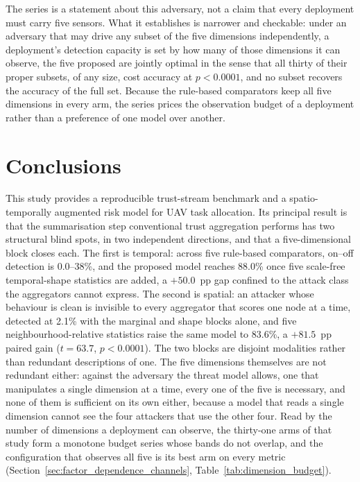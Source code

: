 \documentclass[notspecified,article,submit,moreauthors]{Definitions/mdpi}
\begin{document}
The series is a statement about this adversary, not a claim that every deployment must carry five sensors. What it establishes is narrower and checkable: under an adversary that may drive any subset of the five dimensions independently, a deployment's detection capacity is set by how many of those dimensions it can observe, the five proposed are jointly optimal in the sense that all thirty of their proper subsets, of any size, cost accuracy at $p<0.0001$, and no subset recovers the accuracy of the full set. Because the rule-based comparators keep all five dimensions in every arm, the series prices the observation budget of a deployment rather than a preference of one model over another.

\section{Conclusions}
\label{sec:conclusions}

This study provides a reproducible trust-stream benchmark and a spatio-temporally augmented risk model for UAV task allocation. Its principal result is that the summarisation step conventional trust aggregation performs has two structural blind spots, in two independent directions, and that a five-dimensional block closes each. The first is temporal: across five rule-based comparators, on--off detection is 0.0--38\%, and the proposed model reaches 88.0\% once five scale-free temporal-shape statistics are added, a $+50.0$~pp gap confined to the attack class the aggregators cannot express. The second is spatial: an attacker whose behaviour is clean is invisible to every aggregator that scores one node at a time, detected at 2.1\% with the marginal and shape blocks alone, and five neighbourhood-relative statistics raise the same model to 83.6\%, a $+81.5$~pp paired gain ($t=63.7$, $p<0.0001$). The two blocks are disjoint modalities rather than redundant descriptions of one. The five dimensions themselves are not redundant either: against the adversary the threat model allows, one that manipulates a single dimension at a time, every one of the five is necessary, and none of them is sufficient on its own either, because a model that reads a single dimension cannot see the four attackers that use the other four. Read by the number of dimensions a deployment can observe, the thirty-one arms of that study form a monotone budget series whose bands do not overlap, and the configuration that observes all five is its best arm on every metric (Section~\ref{sec:factor_dependence_channels}, Table~\ref{tab:dimension_budget}).
\end{document}
